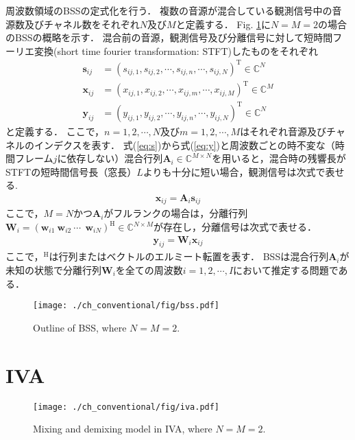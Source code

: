 周波数領域のBSSの定式化を行う．
複数の音源が混合している観測信号中の音源数及びチャネル数をそれぞれ$N$及び$M$と定義する．
Fig. \ref{fig:bss}に$N=M=2$の場合のBSSの概略を示す．
混合前の音源，観測信号及び分離信号に対して短時間フーリエ変換(short time fourier transformation: STFT)したものをそれぞれ
\begin{align}
\bm{s}_{ij} &= (s_{ij,1}, s_{ij,2}, \cdots, s_{ij,n}, \cdots, s_{ij,N})^{\mathrm{T}} \in \mathbb{C}^{N} \label{eq:s} \\
\bm{x}_{ij} &= (x_{ij,1}, x_{ij,2}, \cdots, x_{ij,m}, \cdots, x_{ij,M})^{\mathrm{T}} \in \mathbb{C}^{M} \label{eq:x} \\
\bm{y}_{ij} &= (y_{ij,1}, y_{ij,2}, \cdots, y_{ij,n}, \cdots, y_{ij,N})^{\mathrm{T}} \in \mathbb{C}^{N} \label{eq:y}
\end{align}
と定義する．
ここで，$n=1, 2,  \cdots, N$及び$m=1, 2, \cdots, M$はそれぞれ音源及びチャネルのインデクスを表す．
式(\ref{eq:s})から式(\ref{eq:y})と周波数ごとの時不変な（時間フレーム$j$に依存しない）混合行列$\bm{A}_i \in \mathbb{C}^{M\times N}$を用いると，混合時の残響長がSTFTの短時間信号長（窓長）$L$よりも十分に短い場合，観測信号は次式で表せる.
\begin{align}
  \bm{x}_{ij} = \bm{A}_i \bm{s}_{ij} \label{eq:xas}
\end{align}
ここで，$M=N$かつ$\bm{A}_i$がフルランクの場合は，分離行列$\bm{W}_{i} = (\bm{w}_{i1}~\bm{w}_{i2}~\cdots~ ~\bm{w}_{iN})^{\mathrm{H}} \in \mathbb{C}^{N \times M} $が存在し，分離信号は次式で表せる．
\begin{align}
  \bm{y}_{ij} = \bm{W}_i \bm{x}_{ij} \label{eq:ywj}
\end{align}
ここで，$^{\mathrm{H}}$は行列またはベクトルのエルミート転置を表す．
BSSは混合行列$\bm{A}_i$が未知の状態で分離行列$\bm{W}_{i}$を全ての周波数$i=1, 2, \cdots, I$において推定する問題である．

\begin{figure}[!t]
\centering
\texttt{[image: ./ch\_conventional/fig/bss.pdf]}
\caption{Outline of BSS, where $N=M=2$.}
\label{fig:bss}
\end{figure}



\section{IVA}
\label{sec:conv:iva}
\begin{figure}[t]
\centering
\texttt{[image: ./ch\_conventional/fig/iva.pdf]}
\caption{Mixing and demixing model in IVA, where $N=M=2$.}
\label{fig:ivamodel}
\end{figure}

